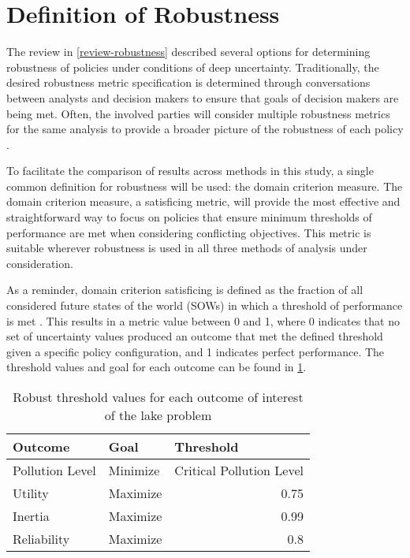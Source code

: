 \section{Definition of Robustness}\label{step0-robust}
The review in \cref{review-robustness} described several options for determining robustness of policies under conditions of deep uncertainty. Traditionally, the desired robustness metric specification is determined through conversations between analysts and decision makers to ensure that goals of decision makers are being met. Often, the involved parties will consider multiple robustness metrics for the same analysis to provide a broader picture of the robustness of each policy \citep{Quinn2017}. 

To facilitate the comparison of results across methods in this study, a single common definition for robustness will be used: the domain criterion measure. The domain criterion measure, a satisficing metric, will provide the most effective and straightforward way to focus on policies that ensure minimum thresholds of performance are met when considering conflicting objectives. This metric is suitable wherever robustness is used in all three methods of analysis under consideration. 

As a reminder, domain criterion satisficing is defined as the fraction of all considered future states of the world (SOWs) in which a threshold of performance is met \citep{Starr1963}. This results in a metric value between 0 and 1, where 0 indicates that no set of uncertainty values produced an outcome that met the defined threshold given a specific policy configuration, and 1 indicates perfect performance. The threshold values and goal for each outcome can be found in \cref{table:robust-thresholds}. 

\begin{table}[h]
    \centering
    \captionsetup{width=0.55\textwidth}
    \caption{Robust threshold values for each outcome of interest of the lake problem}
    \label{table:robust-thresholds}
    
    \setlength\arrayrulewidth{1pt}
    \begin{tabularx}{0.55\textwidth}{l|l|l}
        \rowcolor{tudelft-dark-blue!80}
        \color{white}\bfseries Outcome  &  \color{white}\bfseries Goal  &  \color{white}\bfseries Threshold  \\ 
        \hline
        Pollution Level   & Minimize      & Critical Pollution Level            \\ \hline
        Utility           & Maximize      & \multicolumn{1}{|r|}{0.75}          \\ \hline
        Inertia           & Maximize      & \multicolumn{1}{|r|}{0.99}          \\ \hline
        Reliability       & Maximize      & \multicolumn{1}{|r|}{0.8}           \\
    \end{tabularx}
\end{table}

